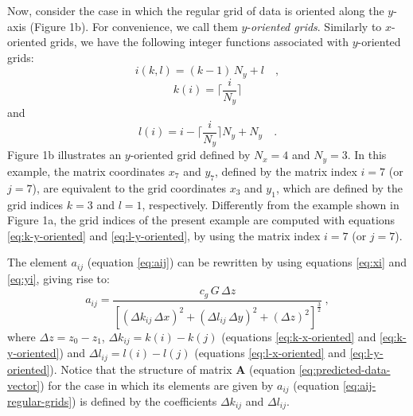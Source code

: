 \documentclass[manuscript,revised]{geophysics}
\begin{document}
Now, consider the case in which the regular grid of data is oriented along 
the $y$-axis (Figure 1b). For convenience, we call them $y$-\textit{oriented grids}.
Similarly to $x$-oriented grids, we have the following integer functions associated with
$y$-oriented grids:
\begin{equation}
i(k, l) = (k - 1) \, N_{y} + l \quad ,
\label{eq:i-y-oriented}
\end{equation}
\begin{equation}
k(i) = \Bigg\lceil \frac{i}{N_{y}} \Bigg\rceil
\label{eq:k-y-oriented}
\end{equation}
and
\begin{equation}
l(i) = i - \Bigg\lceil \frac{i}{N_{y}} \Bigg\rceil N_{y} + N_{y} \quad .
\label{eq:l-y-oriented}
\end{equation}
Figure 1b illustrates an $y$-oriented grid defined by $N_{x} = 4$ and $N_{y} = 3$.
In this example, the matrix coordinates $x_{7}$ and $y_{7}$, defined by the matrix index 
$i = 7$ (or $j = 7$), are equivalent to the grid coordinates $x_{3}$ and $y_{1}$, which are 
defined by the grid indices $k = 3$ and $l = 1$, respectively. Differently from the example
shown in Figure 1a, the grid indices of the present example are 
computed with equations \ref{eq:k-y-oriented} and \ref{eq:l-y-oriented}, by using the 
matrix index $i = 7$ (or $j = 7$).

The element $a_{ij}$ (equation \ref{eq:aij}) can be rewritten 
by using equations \ref{eq:xi} and \ref{eq:yi}, giving rise to:
\begin{equation}
a_{ij} = \frac{c_{g} \, G \, \Delta z}{ \left[ 
	\left( \Delta k_{ij} \, \Delta x \right)^{2} + 
	\left( \Delta l_{ij} \, \Delta y \right)^{2} + 
	\left( \Delta z \right)^{2} \right]^{\frac{3}{2}}} \: ,
\label{eq:aij-regular-grids}
\end{equation}
where $\Delta z = z_{0} - z_{1}$, 
$\Delta k_{ij} = k(i) - k(j)$ (equations \ref{eq:k-x-oriented} and \ref{eq:k-y-oriented}) and
$\Delta l_{ij} = l(i) - l(j)$ (equations \ref{eq:l-x-oriented} and \ref{eq:l-y-oriented}).
Notice that the structure of matrix $\mathbf{A}$ (equation \ref{eq:predicted-data-vector}) for 
the case in which its elements are given by $a_{ij}$ (equation \ref{eq:aij-regular-grids}) is 
defined by the coefficients $\Delta k_{ij}$ and $\Delta l_{ij}$.
\end{document}
